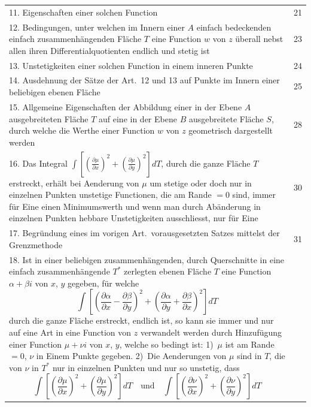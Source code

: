 \documentclass[12pt,a4paper]{book}
\theoremstyle{definition}
\theoremstyle{remark}
\begin{document}
\newpage
\begin{center}
\begin{tabular}{p{}r}
11. Eigenschaften einer solchen Function \dotfill & 21\\[0.5em]
12. Bedingungen, unter welchen im Innern einer $A$ einfach bedeckenden einfach zusammenhängenden Fläche $T$ eine Function $w$ von $z$ überall nebst allen ihren Differentialquotienten endlich und stetig ist \dotfill & 23\\[0.5em]
13. Unstetigkeiten einer solchen Function in einem inneren Punkte \dotfill & 24\\[0.5em]
14. Ausdehnung der Sätze der Art.~12 und 13 auf Punkte im Innern einer beliebigen ebenen Fläche \dotfill & 25\\[0.5em]
15. Allgemeine Eigenschaften der Abbildung einer in der Ebene $A$ ausgebreiteten Fläche $T$ auf eine in der Ebene $B$ ausgebreitete Fläche $S$, durch welche die Werthe einer Function $w$ von $z$ geometrisch dargestellt werden \dotfill & 28\\[0.5em]
16. Das Integral $\int \left[\left(\frac{\partial \mu}{\partial x}\right)^2 + \left(\frac{\partial \mu}{\partial y}\right)^2\right] dT$, durch die ganze Fläche $T$ erstreckt, erhält bei Aenderung von $\mu$ um stetige oder doch nur in einzelnen Punkten unstetige Functionen, die am Rande $= 0$ sind, immer für Eine einen Minimumswerth und wenn man durch Abänderung in einzelnen Punkten hebbare Unstetigkeiten ausschliesst, nur für Eine \dotfill & 30\\[0.5em]
17. Begründung eines im vorigen Art.\ vorausgesetzten Satzes mittelst der Grenzmethode \dotfill & 31\\[0.5em]
18. Ist in einer beliebigen zusammenhängenden, durch Querschnitte in eine einfach zusammenhängende $T^*$ zerlegten ebenen Fläche $T$ eine Function $\alpha + \beta i$ von $x$, $y$ gegeben, für welche
\[
\int \left[\left(\frac{\partial \alpha}{\partial x} - \frac{\partial \beta}{\partial y}\right)^2 + \left(\frac{\partial \alpha}{\partial y} + \frac{\partial \beta}{\partial x}\right)^2\right] dT
\]
durch die ganze Fläche erstreckt, endlich ist, so kann sie immer und nur auf eine Art in eine Function von $z$ verwandelt werden durch Hinzufügung einer Function $\mu + \nu i$ von $x$, $y$, welche so bedingt ist: 1)~$\mu$ ist am Rande $= 0$, $\nu$ in Einem Punkte gegeben. 2)~Die Aenderungen von $\mu$ sind in $T$, die von $\nu$ in $T^*$ nur in einzelnen Punkten und nur so unstetig, dass
\[
\int \left[\left(\frac{\partial \mu}{\partial x}\right)^2 + \left(\frac{\partial \mu}{\partial y}\right)^2\right] dT \quad \text{und} \quad \int \left[\left(\frac{\partial \nu}{\partial x}\right)^2 + \left(\frac{\partial \nu}{\partial y}\right)^2\right] dT
\]
\end{tabular}
\end{center}
\end{document}
